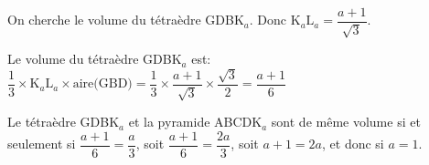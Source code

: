 \documentclass[10pt]{article}
\begin{document}
\begin{enumerate}
\begin{enumerate}
\begin{list}{\textbullet}{On cherche le volume du tétraèdre GDBK$_a$.}
Donc $\text{K}_a\text{L}_a = \dfrac{a+1}{\sqrt{3}}$.
\item Le volume du tétraèdre GDBK$_a$ est:\\
$\dfrac{1}{3}\times \text{K}_a\text{L}_a \times \text{aire(GBD)}
= \dfrac{1}{3} \times \dfrac{a+1}{\sqrt{3}} \times \dfrac{\sqrt{3}}{2}
= \dfrac{a+1}{6}$
\end{list}		

Le tétraèdre GDBK$_a$ et la pyramide ABCDK$_a$ sont de même volume si et seulement si $\dfrac{a+1}{6}=\dfrac{a}{3}$, soit $\dfrac{a+1}{6}=\dfrac{2a}{3}$, soit $a+1=2a$, et donc si $a=1$.
	\end{enumerate}
\end{enumerate}

\bigskip
\end{document}
